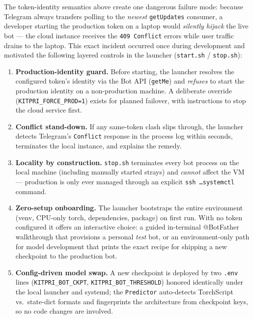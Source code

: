 \documentclass[11pt,a4paper]{article}
\begin{document}
The token-identity semantics above create one dangerous failure mode: because
Telegram always transfers polling to the \emph{newest} \texttt{getUpdates}
consumer, a developer starting the production token on a laptop would
\emph{silently hijack} the live bot --- the cloud instance receives the
\texttt{409 Conflict} errors while user traffic drains to the laptop. This
exact incident occurred once during development and motivated the following
layered controls in the launcher (\texttt{start.sh} / \texttt{stop.sh}):

\begin{enumerate}[itemsep=2pt,topsep=3pt]
  \item \textbf{Production-identity guard.} Before starting, the launcher
        resolves the configured token's identity via the Bot API
        (\texttt{getMe}) and \emph{refuses} to start the production identity
        on a non-production machine. A deliberate override
        (\texttt{KITPRI\_FORCE\_PROD=1}) exists for planned failover, with
        instructions to stop the cloud service first.
  \item \textbf{Conflict stand-down.} If any same-token clash slips through,
        the launcher detects Telegram's \texttt{Conflict} response in the
        process log within seconds, terminates the local instance, and
        explains the remedy.
  \item \textbf{Locality by construction.} \texttt{stop.sh} terminates every
        bot process on the local machine (including manually started strays)
        and \emph{cannot} affect the VM --- production is only ever managed
        through an explicit \texttt{ssh \dots systemctl} command.
  \item \textbf{Zero-setup onboarding.} The launcher bootstraps the entire
        environment (venv, CPU-only torch, dependencies, package) on first
        run. With no token configured it offers an interactive choice:
        a guided in-terminal @BotFather walkthrough that provisions a
        personal \emph{test} bot, or an environment-only path for model
        development that prints the exact recipe for shipping a new
        checkpoint to the production bot.
  \item \textbf{Config-driven model swap.} A new checkpoint is deployed by
        two \texttt{.env} lines (\texttt{KITPRI\_BOT\_CKPT},
        \texttt{KITPRI\_BOT\_THRESHOLD}) honored identically under the local
        launcher and systemd; the \texttt{Predictor} auto-detects TorchScript
        vs.\ state-dict formats and fingerprints the architecture from
        checkpoint keys, so no code changes are involved.
\end{enumerate}
\end{document}
